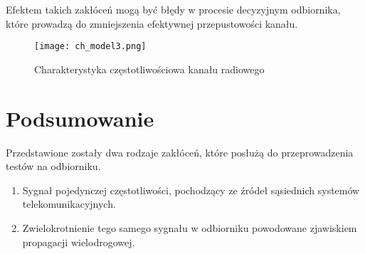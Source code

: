 Efektem takich zakłóceń mogą być błędy w procesie decyzyjnym odbiornika, które prowadzą do zmniejszenia efektywnej przepustowości kanału. 

\begin{figure}[ht]
\centering
\caption{Charakterystyka częstotliwościowa kanału radiowego}
\texttt{[image: ch\_model3.png]}
\label{channel_model}
\end{figure}

\section{Podsumowanie}
Przedstawione zostały dwa rodzaje zakłóceń, które posłużą do przeprowadzenia testów na odbiorniku.
\begin{enumerate}
\item Sygnał pojedynczej częstotliwości, pochodzący ze źródeł sąsiednich systemów telekomunikacyjnych.
\item Zwielokrotnienie tego samego sygnału w odbiorniku powodowane zjawiskiem propagacji wielodrogowej.
\end{enumerate}
